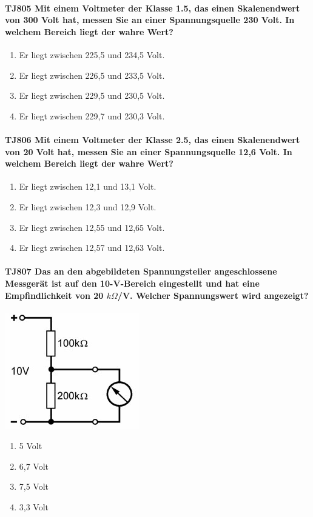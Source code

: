 \documentclass[8pt]{article}
\begin{document}
\paragraph*{TJ805 Mit einem Voltmeter der Klasse 1.5, das einen Skalenendwert von 300 Volt hat, messen Sie an einer Spannungsquelle 230 Volt. In welchem Bereich liegt der wahre Wert?}
\begin{enumerate}[nolistsep,label=\Alph*]
\item Er liegt zwischen 225,5 und 234,5 Volt.
\item Er liegt zwischen 226,5 und 233,5 Volt.
\item Er liegt zwischen 229,5 und 230,5 Volt.
\item Er liegt zwischen 229,7 und 230,3 Volt.
\end{enumerate}

\paragraph*{TJ806 Mit einem Voltmeter der Klasse 2.5, das einen Skalenendwert von 20 Volt hat, messen Sie an einer Spannungsquelle 12,6 Volt. In welchem Bereich liegt der wahre Wert?} 
\begin{enumerate}[nolistsep,label=\Alph*]
\item Er liegt zwischen 12,1 und 13,1 Volt.
\item Er liegt zwischen 12,3 und 12,9 Volt.
\item Er liegt zwischen 12,55 und 12,65 Volt.
\item Er liegt zwischen 12,57 und 12,63 Volt.
\end{enumerate}

\paragraph*{TJ807 Das an den abgebildeten Spannungsteiler angeschlossene Messgerät ist auf den 10-V-Bereich eingestellt und hat eine Empfindlichkeit von 20 $k\Omega$/V. Welcher Spannungswert wird angezeigt?}
\begin{center}
	\begin{minipage}{\linewidth}
		\centering
		\includegraphics[scale=1.0]{pics/tj807_a.jpg}
	\end{minipage}
\end{center}
\begin{enumerate}[nolistsep,label=\Alph*]
\item 5 Volt
\item 6,7 Volt
\item 7,5 Volt
\item 3,3 Volt
\end{enumerate}
\end{document}

